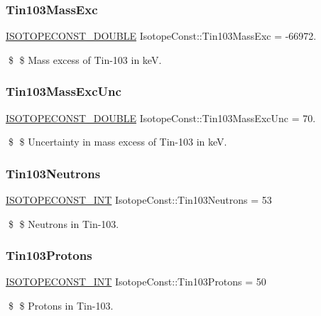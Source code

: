 \subsubsection{\texorpdfstring{Tin103\+Mass\+Exc}{Tin103MassExc}}
{\footnotesize\ttfamily \mbox{\hyperlink{group___isotope_const-_macros_ga8f45a7272ce02c0b4c65c44636ed719a}{I\+S\+O\+T\+O\+P\+E\+C\+O\+N\+S\+T\+\_\+\+D\+O\+U\+B\+LE}} Isotope\+Const\+::\+Tin103\+Mass\+Exc = -\/66972.}

\$ \$ Mass excess of Tin-\/103 in keV. \mbox{\label{group___isotope_const-_tin-_sn103_ga7caf74a02003183f7bd02e1d73ce756d}} 
\subsubsection{\texorpdfstring{Tin103\+Mass\+Exc\+Unc}{Tin103MassExcUnc}}
{\footnotesize\ttfamily \mbox{\hyperlink{group___isotope_const-_macros_ga8f45a7272ce02c0b4c65c44636ed719a}{I\+S\+O\+T\+O\+P\+E\+C\+O\+N\+S\+T\+\_\+\+D\+O\+U\+B\+LE}} Isotope\+Const\+::\+Tin103\+Mass\+Exc\+Unc = 70.}

\$ \$ Uncertainty in mass excess of Tin-\/103 in keV. \mbox{\label{group___isotope_const-_tin-_sn103_gaacd4dea61292dfc213a42e68abfa3389}} 
\subsubsection{\texorpdfstring{Tin103\+Neutrons}{Tin103Neutrons}}
{\footnotesize\ttfamily \mbox{\hyperlink{group___isotope_const-_macros_ga5f18360b3e99483a35c32d789e62621c}{I\+S\+O\+T\+O\+P\+E\+C\+O\+N\+S\+T\+\_\+\+I\+NT}} Isotope\+Const\+::\+Tin103\+Neutrons = 53}

\$ \$ Neutrons in Tin-\/103. \mbox{\label{group___isotope_const-_tin-_sn103_ga5c41c9ec8efde592937ea1589dbd4760}} 
\subsubsection{\texorpdfstring{Tin103\+Protons}{Tin103Protons}}
{\footnotesize\ttfamily \mbox{\hyperlink{group___isotope_const-_macros_ga5f18360b3e99483a35c32d789e62621c}{I\+S\+O\+T\+O\+P\+E\+C\+O\+N\+S\+T\+\_\+\+I\+NT}} Isotope\+Const\+::\+Tin103\+Protons = 50}

\$ \$ Protons in Tin-\/103. 
